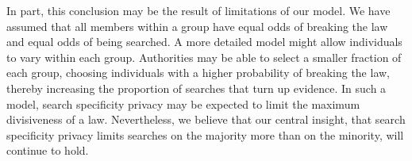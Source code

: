 In part, this conclusion may be the result of limitations of our model.  We have assumed that all members within a group have equal odds of breaking the law and equal odds of being searched.  A more detailed model might allow individuals to vary within each group.  Authorities may be able to select a smaller fraction of each group, choosing individuals with a higher probability of breaking the law, thereby increasing the proportion of searches that turn up evidence.  In such a model, search specificity privacy may be expected to limit the maximum divisiveness of a law.  Nevertheless, we believe that our central insight, that search specificity privacy limits searches on the majority more than on the minority, will continue to hold.






